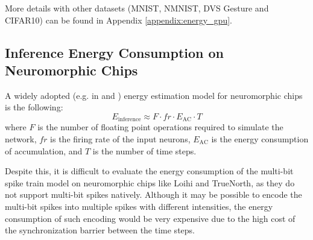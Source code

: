         More details with other datasets (MNIST, NMNIST, DVS Gesture and CIFAR10) can be found in Appendix \ref{appendix:energy_gpu}.

    \subsection{Inference Energy Consumption on Neuromorphic Chips}
    \label{subsec:inference_energy}
        A widely adopted (e.g. in \cite{zhu2024spikegptgenerativepretrainedlanguage} and \cite{chen2024deepreinforcementlearningspiking}) energy estimation model for neuromorphic chips is the following:
        \begin{equation}
            \label{eq:inference_energy_popular}
            E_{\text{inference}} \approx F \cdot fr \cdot E_{\text{AC}} \cdot T
        \end{equation}
        where $F$ is the number of floating point operations required to simulate the network, $fr$ is the firing rate of the input neurons, $E_{\text{AC}}$ is the energy consumption of accumulation, and $T$ is the number of time steps. 
    
        Despite this, it is difficult to evaluate the energy consumption of the multi-bit spike train model on neuromorphic chips like Loihi and TrueNorth, as they do not support multi-bit spikes natively. Although it may be possible to encode the multi-bit spikes into multiple spikes with different intensities, the energy consumption of such encoding would be very expensive due to the high cost of the synchronization barrier between the time steps. 

